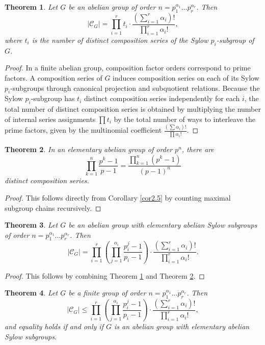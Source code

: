\documentclass[11pt,a4paper]{article}
\newtheorem{theorem}{Theorem}[section]
\theoremstyle{definition}
\begin{document}
\begin{theorem}\label{thm3.4}
Let $G$ be an abelian group of order $n = p_1^{\alpha_1} \dots p_r^{\alpha_r}$. Then
\[
|\mathcal{C}_G| = \prod_{i=1}^r t_i \cdot \frac{(\sum_{i=1}^r \alpha_i)!}{\prod_{i=1}^r \alpha_i!},
\]
where $t_i$ is the number of distinct composition series of the Sylow $p_i$-subgroup of $G$.
\end{theorem}

\begin{proof}
In a finite abelian group, composition factor orders correspond to prime factors. A composition series of $G$ induces composition series on each of its Sylow $p_i$-subgroups through canonical projection and subquotient relations. Because the Sylow $p_i$-subgroup has $t_i$ distinct composition series independently for each $i$, the total number of distinct composition series is obtained by multiplying the number of internal series assignments $\prod t_i$ by the total number of ways to interleave the prime factors, given by the multinomial coefficient $\frac{(\sum \alpha_i)!}{\prod \alpha_i!}$.
\end{proof}

\begin{theorem}\label{thm3.5}
In an elementary abelian group of order $p^n$, there are
\[
\prod_{k=1}^n \frac{p^k - 1}{p - 1} = \frac{\prod_{k=1}^n (p^k - 1)}{(p - 1)^n}
\]
distinct composition series.
\end{theorem}

\begin{proof}
This follows directly from Corollary \ref{cor2.5} by counting maximal subgroup chains recursively.
\end{proof}

\begin{theorem}\label{thm3.6}
Let $G$ be an abelian group with elementary abelian Sylow subgroups of order $n = p_1^{\alpha_1} \dots p_r^{\alpha_r}$. Then
\[
|\mathcal{C}_G| = \prod_{i=1}^r \left( \prod_{j=1}^{\alpha_i} \frac{p_i^j - 1}{p_i - 1} \right) \cdot \frac{(\sum_{i=1}^r \alpha_i)!}{\prod_{i=1}^r \alpha_i!}.
\]
\end{theorem}

\begin{proof}
This follows by combining Theorem \ref{thm3.4} and Theorem \ref{thm3.5}.
\end{proof}

\begin{theorem}\label{thm3.7}
Let $G$ be a finite group of order $n = p_1^{\alpha_1} \dots p_r^{\alpha_r}$. Then
\[
|\mathcal{C}_G| \le \prod_{i=1}^r \left( \prod_{j=1}^{\alpha_i} \frac{p_i^j - 1}{p_i - 1} \right) \cdot \frac{(\sum_{i=1}^r \alpha_i)!}{\prod_{i=1}^r \alpha_i!},
\]
and equality holds if and only if $G$ is an abelian group with elementary abelian Sylow subgroups.
\end{theorem}
\end{document}
